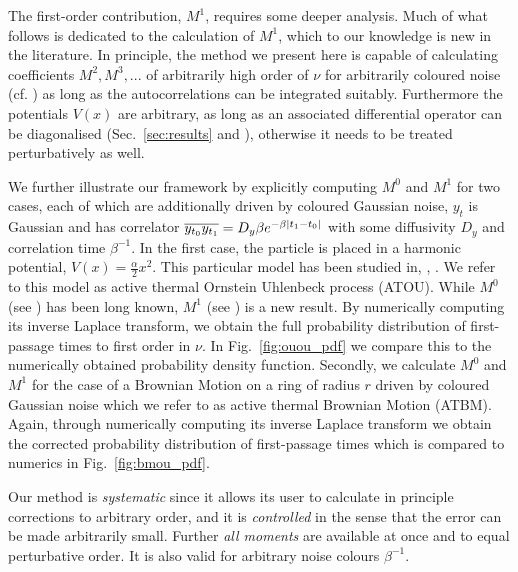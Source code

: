 \documentclass[%
 reprint,
superscriptaddress,
nofootinbib,
 amsmath,amssymb,
 aps,
prx,
]{revtex4-2}
\begin{document}
 The first-order contribution, $M^1$, requires some deeper analysis. Much of what follows is dedicated to the calculation of $M^1$, which to our knowledge is new in the literature. 
In principle, the method we present here is capable of calculating coefficients $M^2, M^3,...$ of arbitrarily high order of $\nu$ for arbitrarily coloured noise  (cf. ) as long as the autocorrelations can be integrated suitably. Furthermore the potentials  $V(x)$ are arbitrary, as long as an associated differential operator can be diagonalised (Sec.~\ref{sec:results} and \cite{bakry_analysis_2013}), otherwise it needs to be treated perturbatively as well.

We further illustrate our framework by explicitly computing $M^0$ and $M^1$ for two cases, each of which are additionally driven by coloured Gaussian noise, \ie $y_t$ is Gaussian and has correlator $\overline{y_{t_0}y_{t_1}} = D_y\beta e^{-\beta|t_1-t_0|}$ with some diffusivity $D_y$ and correlation time $\beta^{-1}$. In the first case, the particle is placed in a harmonic potential, $V(x) = \frac{\alpha}{2}x^2$. This particular model has been studied in, \eg, \cite{dabelow_irreversibility_2019}. We refer to this model as active thermal Ornstein Uhlenbeck process (ATOU). While $M^0$ (see ) has been long known, $M^1$ (see ) is  a new result.  By numerically computing its inverse Laplace transform, we obtain the full probability distribution of first-passage times to first order in $\nu$. In Fig.~\ref{fig:ouou_pdf} we compare this to the numerically obtained probability density function. 
Secondly, we calculate $M^0$ and $M^1$ for the case of a Brownian Motion on a ring of radius $r$ driven by coloured Gaussian noise which we refer to as active thermal Brownian Motion (ATBM). Again, through numerically computing its inverse Laplace transform we obtain the corrected probability distribution of first-passage times which is compared to numerics in Fig.~\ref{fig:bmou_pdf}. 

Our method is \emph{systematic} since it allows its user to calculate in principle corrections to arbitrary order, and it is \emph{controlled} in the sense that the error can be made arbitrarily small. Further \emph{all moments} are available at once and to equal perturbative order. It is also valid for arbitrary noise colours $\beta^{-1}$. 
\end{document}
